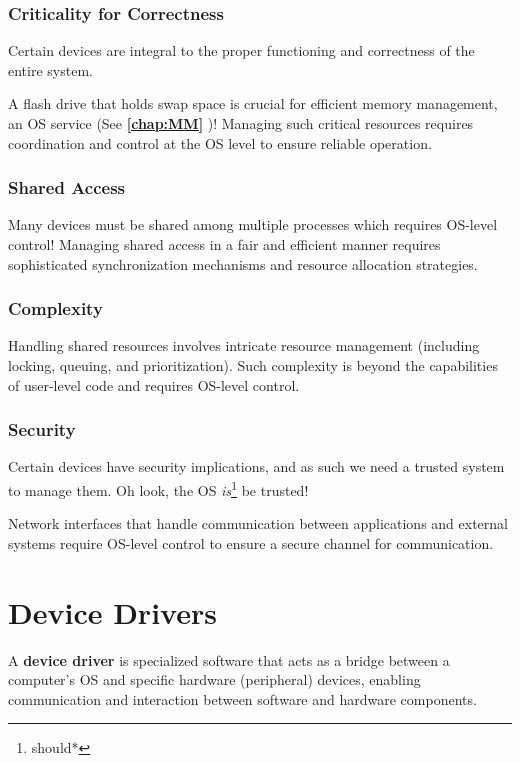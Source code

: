\documentclass{report}
\newcommand{\definitionBegin}[1]{\begin{tcolorbox}[title={Definition: #1}]}
\newcommand{\definitionEnd}{\end{tcolorbox}}
\newcommand{\exampleBegin}[1]{\begin{tcolorbox}[colback=blue!5!white,colframe=black!75!blue,title={Example:
      #1}]}
\newcommand{\exampleEnd}{\end{tcolorbox}}
\newcommand{\refto}[2]{\textbf{\ref{#1:#2} \nameref{#1:#2}}}
\begin{document}
\subsubsection{Criticality for Correctness}
Certain devices are integral to the proper functioning and correctness of the entire system.

\exampleBegin{Flash Drives}
A flash drive that holds swap space is crucial for efficient memory management, an OS service (See
\refto{chap}{MM})! Managing such critical resources requires coordination and control at the OS
level to ensure reliable operation.
\exampleEnd


\subsubsection{Shared Access}
Many devices must be shared among multiple processes which requires OS-level control! Managing
shared access in a fair and efficient manner requires sophisticated synchronization mechanisms and
resource allocation strategies.


\subsubsection{Complexity}
Handling shared resources involves intricate resource management (including locking, queuing, and
prioritization). Such complexity is beyond the capabilities of user-level code and requires OS-level
control.


\subsubsection{Security}
Certain devices have security implications, and as such we need a trusted system to manage them. Oh
look, the OS \textit{is}\footnote{should*} be trusted!

\exampleBegin{Network Interfaces}
Network interfaces that handle communication between applications and external
systems require OS-level control to ensure a secure channel for communication.
\exampleEnd





\section{Device Drivers}
\definitionBegin{Device Driver}
A \textbf{device driver} is specialized software that acts as a bridge between a computer's OS and
specific hardware (peripheral) devices, enabling communication and interaction between software and
hardware components.
\definitionEnd
\end{document}
